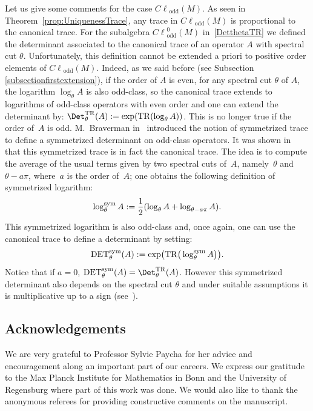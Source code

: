 \documentclass[pdftex]{sigma}
\DeclareMathOperator{\TR}{TR} \DeclareMathOperator{\Op}{Op}
\DeclareMathOperator{\odd}{odd} \DeclareMathOperator{\supp}{supp}
\def \Cl {{C\ell}}
\begin{document}
\begin{remark}
Let us give some comments for the case $\Cl_{\odd}(M)$. As seen in Theorem~\ref{prop:UniquenessTrace}, any trace in $\Cl_{\odd}(M)$ is proportional to the canonical trace. For the subalgebra $\Cl_{\odd}^{0}(M)$ in~\eqref{DetthetaTR} we def\/ined the determinant associated to the canonical trace of an operator $A$ with spectral cut $\theta$. Unfortunately, this def\/inition cannot be extended a priori to positive order elements of $\Cl_{\odd}(M)$. Indeed, as we said before (see Subsection \ref{subsectionfirstextension}), if the order of $A$ is even, for any spectral cut $\theta$ of $A$, the logarithm $\log_\theta A$ is also odd-class, so the canonical trace extends to logarithms of odd-class operators with even order and one can extend the determinant by: ${\Det}_{\theta}^{\TR}(A):= {\exp}({{\TR}(\log_\theta A)})$. This is no longer true if the order of~$A$ is odd. M.~Braverman in~\cite{Braverman} introduced the notion of symmetrized trace to def\/ine a symmetrized determinant on odd-class operators. It was shown in~\cite{ouedraogo} that this symmetrized trace is in fact the canonical trace. The idea is to compute the average of the usual terms given by two spectral cuts of~$A$, namely~$\theta$ and~$\theta-a\pi$, where~$a$ is the order of~$A$; one obtains the following def\/inition of symmetrized logarithm:
\[
\log_\theta^{\rm sym}A:=\frac{1}{2} (\log_\theta A+\log_{\theta-a\pi}A ).
\]
This symmetrized logarithm is also odd-class and, once again, one can use the canonical trace to def\/ine a determinant by setting:
\[
{\rm DET}_{\theta}^{\rm sym}(A):= {\exp}\big({\TR}\big(\log_\theta^{\rm sym} A\big)\big).
\]
Notice that if $a=0$, ${\rm DET}_{\theta}^{\rm sym}(A)={\Det}_{\theta}^{\TR}(A)$.
However this symmetrized determinant also depends on the spectral cut $\theta$ and under suitable assumptions it is multiplicative up to a sign (see~\cite{Braverman}).
\end{remark}

\subsection*{Acknowledgements}

We are very grateful to Professor Sylvie Paycha for her advice and encouragement along an important part of our careers.  We express our gratitude to the Max Planck Institute for Mathe\-matics in Bonn and the University of Regensburg where part of this work was done.  We would also like to thank the anonymous referees for providing constructive comments on the manuscript.
\end{document}
